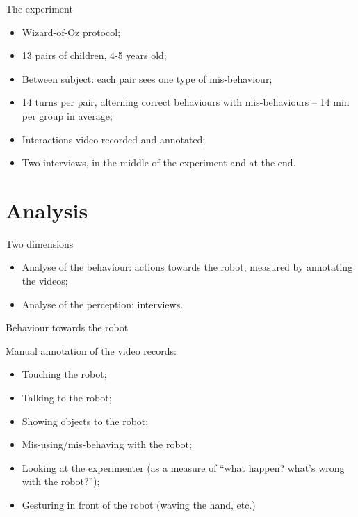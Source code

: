 \documentclass[compress]{beamer}
\renewcommand{\bf}{\Medium}
\begin{document}
\begin{frame}{The experiment}
    \begin{itemize}
        \item<1-> Wizard-of-Oz protocol;
        \item<2-> 13 pairs of children, 4-5 years old;
        \item<3-> Between subject: each pair sees one type of mis-behaviour;
        \item<4-> 14 turns per pair, alterning correct behaviours with
            mis-behaviours -- 14 min per group in average;
        \item<5-> Interactions video-recorded and annotated;
        \item<6-> Two interviews, in the middle of the experiment and at the
            end.
    \end{itemize}
\end{frame}

\section{Analysis}

\begin{frame}{Two dimensions}
    \begin{itemize}
        \item Analyse of the {\bf behaviour}: actions towards the robot,
            measured by annotating the videos;
        \item Analyse of the {\bf perception}: interviews.
    \end{itemize}
\end{frame}


\begin{frame}{Behaviour towards the robot}

    Manual annotation of the video records:
    \begin{itemize}
        \item Touching the robot;
        \item Talking to the robot;
        \item Showing objects to the robot;
        \item Mis-using/mis-behaving with the robot;
        \item Looking at the experimenter (as a measure of ``what happen? what's
            wrong with the robot?'');
        \item Gesturing in front of the robot (waving the hand, etc.)
    \end{itemize}
\end{frame}
\end{document}
